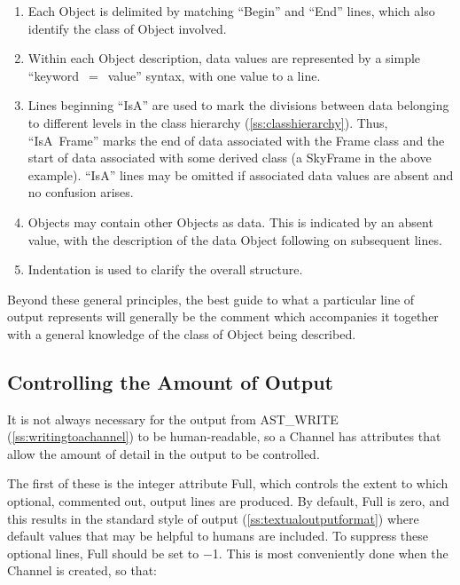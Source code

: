 \documentclass[twoside,11pt]{article}
\newcommand{\htmlref}[2]{#1}
\newcommand{\appref}[1]{Appendix~\ref{#1}}
\newcommand{\secref}[1]{\S\ref{#1}}
\renewcommand{\appref}[1]{\ref{#1}}
\renewcommand{\secref}[1]{\ref{#1}}
\begin{document}
\begin{enumerate}
\item Each Object is delimited by matching ``Begin'' and ``End''
lines, which also identify the class of Object involved.

\item Within each Object description, data values are represented
by a simple ``keyword~$=$~value'' syntax, with one value to a line.

\item Lines beginning ``IsA'' are used to mark the divisions between
data belonging to different levels in the class hierarchy
(\appref{ss:classhierarchy}). Thus, ``IsA~\htmlref{Frame}{Frame}'' marks the end of data
associated with the Frame class and the start of data associated with
some derived class (a SkyFrame in the above example). ``IsA'' lines
may be omitted if associated data values are absent and no confusion
arises.

\item Objects may contain other Objects as data. This is
indicated by an absent value, with the description of the data
Object following on subsequent lines.

\item Indentation is used to clarify the overall structure.
\end{enumerate}

Beyond these general principles, the best guide to what a particular
line of output represents will generally be the comment which
accompanies it together with a general knowledge of the class of
Object being described.

\subsection{\label{ss:controllingchanneloutput}Controlling the Amount of Output}

It is not always necessary for the output from \htmlref{AST\_WRITE}{AST_WRITE}
(\secref{ss:writingtoachannel}) to be human-readable, so a \htmlref{Channel}{Channel} has
attributes that allow the amount of detail in the output to be
controlled.

The first of these is the integer attribute \htmlref{Full}{Full}, which controls the
extent to which optional, commented out, output lines are produced. By
default, Full is zero, and this results in the standard style of
output (\secref{ss:textualoutputformat}) where default values that may
be helpful to humans are included. To suppress these optional lines,
Full should be set to $-$1. This is most conveniently done when the
Channel is created, so that:
\end{document}
